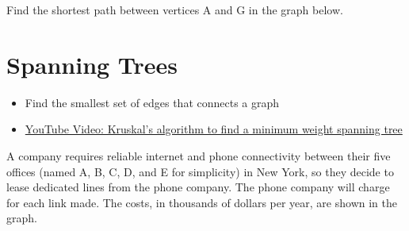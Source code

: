 \begin{exercise}{}{} %
Find the shortest path between vertices A and G in the graph below.\\

\end{exercise}



\section{Spanning Trees}
\begin{outcome}
\begin{itemize}
\item Find the smallest set of edges that connects a graph
\end{itemize}
\end{outcome}

\begin{resource}
\begin{itemize}
\item \href{https://youtu.be/d9GcoLAA-dU}{YouTube Video: Kruskal's algorithm to find a minimum weight spanning tree}
\end{itemize}
\end{resource}

A company requires reliable internet and phone connectivity between their five offices (named A, B, C, D, and E for simplicity) in New York, so they decide to lease dedicated lines from the phone company.  The phone company will charge for each link made.  The costs, in thousands of dollars per year, are shown in the graph.

